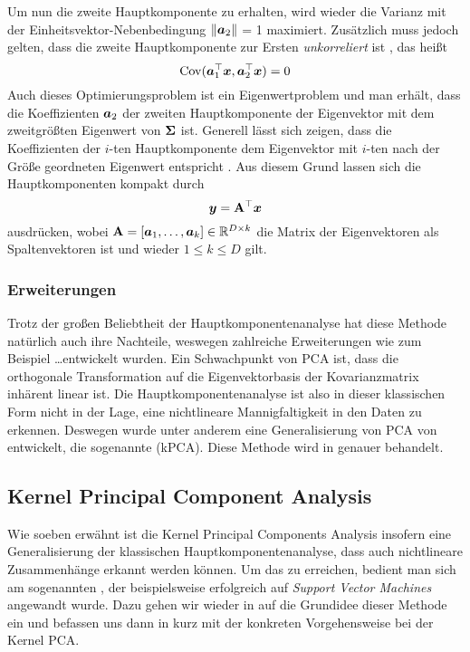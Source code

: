 Um nun die zweite Hauptkomponente zu erhalten, wird wieder die Varianz mit der
Einheitsvektor-Nebenbedingung $\left\lVert\bm{a}_2\right\rVert$ = 1 maximiert. Zusätzlich muss jedoch gelten,
dass die zweite Hauptkomponente zur Ersten \textit{unkorreliert} ist \parencite[5]{Jolliffe.2002}, das heißt
\begin{equation}
	\operatorname{Cov}(\bm{a}_1^\top\bm{x}, \bm{a}_2^\top\bm{x}) = 0
\end{equation}
Auch dieses Optimierungsproblem ist ein Eigenwertproblem und man erhält, dass die Koeffizienten $\bm{a}_2$ der zweiten Hauptkomponente der Eigenvektor mit dem zweitgrößten Eigenwert von $\mathbf{\Sigma}$ ist.
Generell lässt sich zeigen, dass die Koeffizienten der $i$-ten Hauptkomponente dem Eigenvektor mit $i$-ten nach der Größe geordneten Eigenwert entspricht \parencite[6]{Jolliffe.2002}. Aus diesem Grund lassen sich die Hauptkomponenten kompakt durch
\begin{equation}
	\bm{y} = \mathbf{A}^\top \bm{x}
\end{equation}
ausdrücken, wobei $\mathbf{A} = [\bm{a}_1,\ldots,\bm{a}_k] \in \mathbb{R}^{D \times k}$ die Matrix der Eigenvektoren als Spaltenvektoren ist und wieder $1 \leq k \leq D$ gilt.

\subsubsection{Erweiterungen}
\label{ch:MethodenDerDimRed:statistisch:PCA:Erweiterungen}
Trotz der großen Beliebtheit der Hauptkomponentenanalyse hat diese Methode natürlich auch ihre Nachteile, weswegen zahlreiche Erweiterungen wie zum Beispiel \ldots\addref entwickelt wurden.
Ein Schwachpunkt von PCA ist, dass die orthogonale Transformation auf die Eigenvektorbasis der Kovarianzmatrix inhärent linear ist. Die Hauptkomponentenanalyse ist also in dieser klassischen Form nicht in der Lage, eine nichtlineare Mannigfaltigkeit in den Daten zu erkennen. Deswegen wurde unter anderem eine Generalisierung von PCA von \textcite{Scholkopf.1997} entwickelt, die sogenannte  (kPCA). Diese Methode wird in  genauer behandelt.

\subsection{Kernel Principal Component Analysis}
\label{ch:MethodenDerDimRed:statistisch:kPCA}
Wie soeben erwähnt ist die Kernel Principal Components Analysis insofern eine Generalisierung der klassischen Hauptkomponentenanalyse, dass auch nichtlineare Zusammenhänge erkannt werden können.
Um das zu erreichen, bedient man sich am sogenannten , der beispielsweise erfolgreich auf \textit{Support Vector Machines} \parencite{Boser.1992} angewandt wurde. Dazu gehen wir wieder in
 auf die Grundidee dieser Methode ein
und befassen uns dann in 
kurz mit der konkreten Vorgehensweise bei der Kernel PCA.

